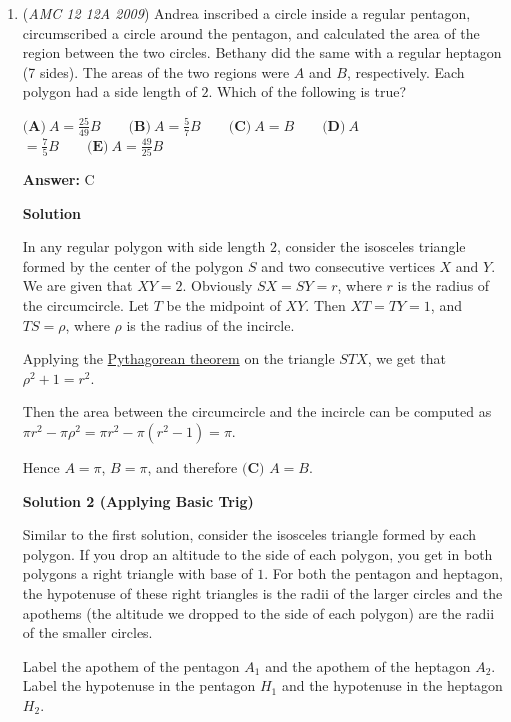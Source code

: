 \begin{enumerate}
 Written by ChristianZhang

 


	\item (\textit{AMC 12 12A 2009}) Andrea inscribed a circle inside a regular pentagon, circumscribed a circle around the pentagon, and calculated the area of the region between the two circles.  Bethany did the same with a regular heptagon (7 sides).  The areas of the two regions were $A$ and $B$, respectively.  Each polygon had a side length of $2$.  Which of the following is true?


 $\textbf{(A)}\ A = \frac {25}{49}B\qquad \textbf{(B)}\ A = \frac {5}{7}B\qquad \textbf{(C)}\ A = B\qquad \textbf{(D)}\ A$ $= \frac {7}{5}B\qquad \textbf{(E)}\ A = \frac {49}{25}B$

 \textbf{Answer: }C



\textbf{Solution}

In any regular polygon with side length $2$, consider the isosceles triangle formed by the center of the polygon $S$ and two consecutive vertices $X$ and $Y$. We are given that $XY=2$. Obviously $SX=SY=r$, where $r$ is the radius of the circumcircle. Let $T$ be the midpoint of $XY$. Then $XT=TY=1$, and $TS=\rho$, where $\rho$ is the radius of the incircle.

 Applying the \href{https://artofproblemsolving.com/wiki/index.php?title=Pythagorean\_theorem}{Pythagorean theorem} on the triangle $STX$, we get that $\rho^2 + 1 = r^2$.

 Then the area between the circumcircle and the incircle can be computed as $\pi r^2 - \pi \rho^2 = \pi r^2 - \pi (r^2 - 1) = \pi$.

 Hence $A=\pi$, $B=\pi$, and therefore $\boxed{\textbf{(C) }A=B}$.

 



\textbf{Solution 2 (Applying Basic Trig)}

Similar to the first solution, consider the isosceles triangle formed by each polygon.  If you drop an altitude to the side of each polygon, you get in both polygons a right triangle with base of $1$.  For both the pentagon and heptagon, the hypotenuse of these right triangles is the radii of the larger circles and the apothems (the altitude we dropped to the side of each polygon) are the radii of the smaller circles. 

 Label the apothem of the pentagon $A_{1}$ and the apothem of the heptagon $A_{2}$.  Label the hypotenuse in the pentagon $H_{1}$ and the hypotenuse in the heptagon $H_{2}$.


\end{enumerate}
